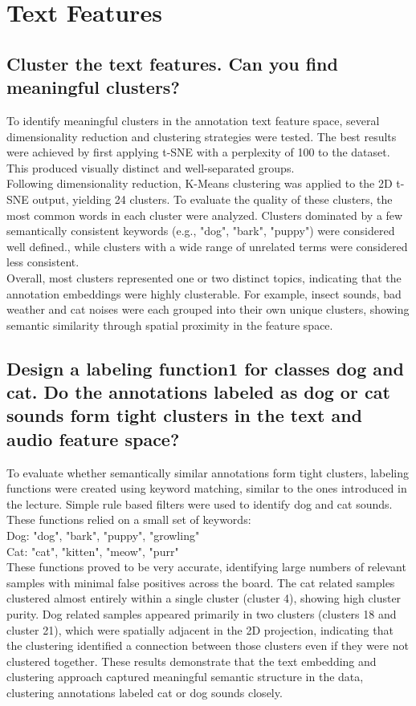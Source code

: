 
\section{Text Features}
\label{sec:Text Features}


\subsection{Cluster the text features. Can you find meaningful clusters?}
\label{sec:Text Features:a}
To identify meaningful clusters in the annotation text feature space, several dimensionality reduction and clustering strategies were tested. The best results were achieved by first applying t-SNE with a perplexity of 100 to the dataset. This produced visually distinct and well-separated groups. \\
Following dimensionality reduction, K-Means clustering was applied to the 2D t-SNE output, yielding 24 clusters. To evaluate the quality of these clusters, the most common words in each cluster were analyzed. Clusters dominated by a few semantically consistent keywords (e.g., "dog", "bark", "puppy") were considered well defined., while clusters with a wide range of unrelated terms were considered less consistent. \\
Overall, most clusters represented one or two distinct topics, indicating that the annotation embeddings were highly clusterable. For example, insect sounds, bad weather and cat noises were each grouped into their own unique clusters, showing semantic similarity through spatial proximity in the feature space.


\subsection{Design a labeling function1 for classes dog and cat. Do the annotations labeled as dog or cat sounds
form tight clusters in the text and audio feature space?}
\label{sec:Text Features:b}

To evaluate whether semantically similar annotations form tight clusters, labeling functions were created using keyword matching, similar to the ones introduced in the lecture. Simple rule based filters were used to identify dog and cat sounds. These functions relied on a small set of keywords:\\
Dog: "dog", "bark", "puppy", "growling"\\
Cat: "cat", "kitten", "meow", "purr"\\
These functions proved to be very accurate, identifying large numbers of relevant samples with minimal false positives across the board. The cat related samples clustered almost entirely within a single cluster (cluster 4), showing high cluster purity. Dog related samples appeared primarily in two clusters (clusters 18 and cluster 21), which were spatially adjacent in the 2D projection, indicating that the clustering identified a connection between those clusters even if they were not clustered together.
These results demonstrate that the text embedding and clustering approach captured meaningful semantic structure in the data, clustering annotations labeled cat or dog sounds closely.

